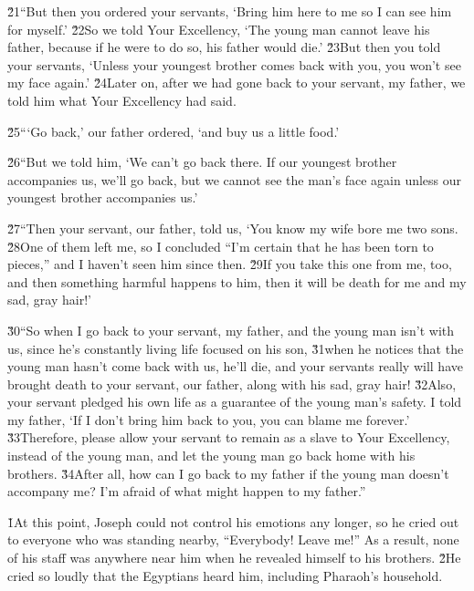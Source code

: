 \v{21}``But then you ordered your servants, `Bring him here to me so I can see him for myself.' \v{22}So we told Your Excellency, `The young man cannot leave his father, because if he were to do so, his father would die.' \v{23}But then you told your servants, `Unless your youngest brother comes back with you, you won't see my face again.' \v{24}Later on, after we had gone back to your servant, my father, we told him what Your Excellency had said.

\v{25}```Go back,' our father ordered, `and buy us a little food.'

\v{26}``But we told him, `We can't go back there. If our youngest brother accompanies us, we'll go back, but we cannot see the man's face again unless our youngest brother accompanies us.'

\v{27}``Then your servant, our father, told us, `You know my wife bore me two sons. \v{28}One of them left me, so I concluded ``I'm certain that he has been torn to pieces,'' and I haven't seen him since then. \v{29}If you take this one from me, too, and then something harmful happens to him, then it will be death for me and my sad, gray hair!'

\v{30}``So when I go back to your servant, my father, and the young man isn't with us, since he's constantly living life focused on his son, \v{31}when he notices that the young man hasn't come back with us, he'll die, and your servants really will have brought death to your servant, our father, along with his sad, gray hair! \v{32}Also, your servant pledged his own life as a guarantee of the young man's safety. I told my father, `If I don't bring him back to you, you can blame me forever.' \v{33}Therefore, please allow your servant to remain as a slave to Your Excellency, instead of the young man, and let the young man go back home with his brothers. \v{34}After all, how can I go back to my father if the young man doesn't accompany me? I'm afraid of what might happen to my father.''

\v{1}At this point, Joseph could not control his emotions any longer, so he cried out to everyone who was standing nearby, ``Everybody! Leave me!'' As a result, none of his staff was anywhere near him when he revealed himself to his brothers. \v{2}He cried so loudly that the Egyptians heard him, including Pharaoh's household.

